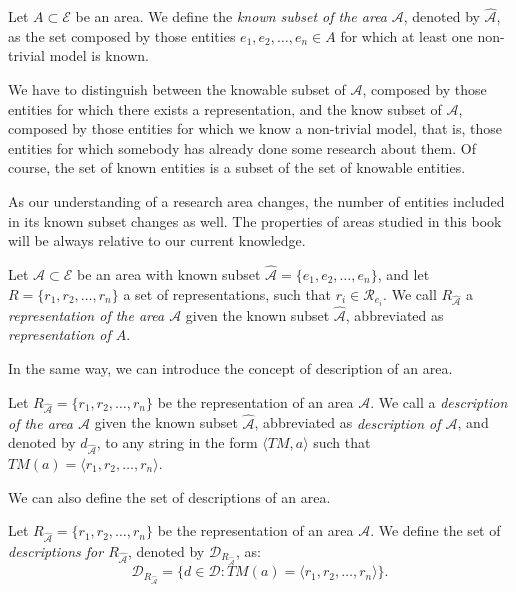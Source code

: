 \begin{definition}
Let $A \subset \mathcal{E}$ be an area. We define the \emph{known subset of the area} $\mathcal{A}$, denoted by $\hat{\mathcal{A}}$, as the set composed by those entities $e_1, e_2, \ldots, e_n \in A$ for which at least one non-trivial model is known.
\end{definition}

We have to distinguish between the knowable subset of $\mathcal{A}$, composed by those entities for which there exists a representation, and the know subset of $\mathcal{A}$, composed by those entities for which we know a non-trivial model, that is, those entities for which somebody has already done some research about them. Of course, the set of known entities is a subset of the set of knowable entities.

As our understanding of a research area changes, the number of entities included in its known subset changes as well. The properties of areas studied in this book will be always relative to our current knowledge.

\begin{definition}
Let $\mathcal{A} \subset \mathcal{E}$ be an area with known subset $\hat{\mathcal{A}} = \{ e_1, e_2, \ldots, e_n \}$, and let  $R = \{ r_1, r_2, \ldots, r_n \}$ a set of representations, such that $r_i \in \mathcal{R}_{e_i}$. We call $R_{\hat{\mathcal{A}}}$ a \emph{representation of the area $\mathcal{A}$} given the known subset $\hat{\mathcal{A}}$, abbreviated as \emph{representation of $A$}.
\end{definition}

In the same way, we can introduce the concept of description of an area.

\begin{definition}
Let $R_{\hat{\mathcal{A}}} = \{ r_1, r_2, \ldots, r_n \}$ be the representation of an area $\mathcal{A}$. We call a \emph{description of the area $\mathcal{A}$} given the known subset $\hat{\mathcal{A}}$, abbreviated as \emph{description of $\mathcal{A}$}, and denoted by $d_{\hat{\mathcal{A}}}$, to any string in the form $\langle TM, a\rangle$ such that $TM(a) = \langle r_1, r_2, \ldots, r_n\rangle$.
\end{definition}

We can also define the set of descriptions of an area.

\begin{definition}
Let $R_{\hat{\mathcal{A}}} = \{ r_1, r_2, \ldots, r_n \}$ be the representation of an area $\mathcal{A}$. We define the set of \emph{descriptions for $R_{\hat{\mathcal{A}}}$}, denoted by $\mathcal{D}_{R_{\hat{\mathcal{A}}}}$, as:
\[
\mathcal{D}_{R_{\hat{\mathcal{A}}}} = \{ d \in \mathcal{D} : TM(a) = \langle r_1, r_2, \ldots, r_n\rangle \}.
\]
\end{definition}

